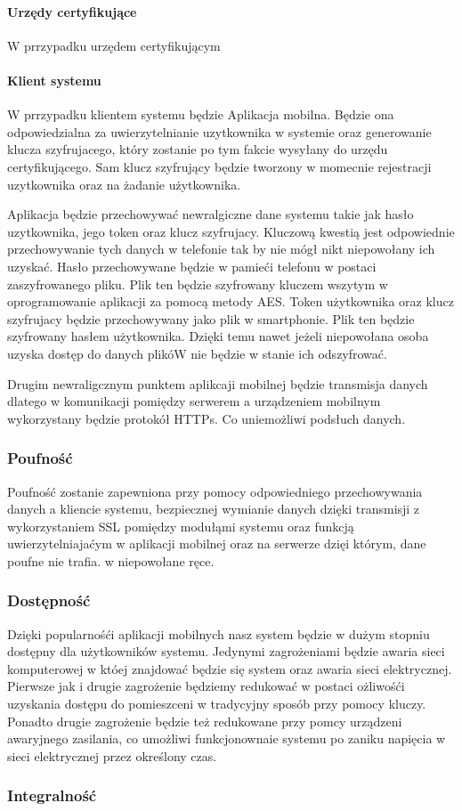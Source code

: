 		\paragraph*{Urzędy certyfikujące}
		W prrzypadku \NazwaSys urzędem certyfikującym 
		\paragraph*{Klient systemu}
		W prrzypadku \NazwaSys klientem systemu będzie Aplikacja mobilna. Będzie ona odpowiedzialna za uwierzytelnianie uzytkownika w systemie oraz generowanie klucza szyfrujacego, który zostanie po tym fakcie wysyłany do urzędu certyfikującego. Sam klucz szyfrujący będzie tworzony w momecnie rejestracji uzytkownika oraz na żadanie użytkownika.
		 
		Aplikacja będzie przechowywać newralgiczne dane systemu takie jak hasło uzytkownika, jego token oraz klucz szyfrujacy. Kluczową kwestią jest odpowiednie przechowywanie tych danych w telefonie tak by nie mógł nikt niepowołany ich uzyskać. Hasło przechowywane będzie w pamieći telefonu w postaci zaszyfrowanego pliku. Plik ten będzie szyfrowany kluczem wszytym w oprogramowanie aplikacji za pomocą metody AES. Token użytkownika oraz klucz szyfrujacy będzie przechowywany jako plik w smartphonie. Plik ten będzie szyfrowany hasłem użytkownika. Dzięki temu nawet jeżeli niepowołana osoba uzyska dostęp do danych plikóW nie będzie w stanie ich odszyfrować.
		
		Drugim newraligcznym punktem aplikcaji mobilnej będzie transmisja danych dlatego w komunikacji pomiędzy serwerem a urządzeniem mobilnym wykorzystany będzie protokół HTTPs. Co uniemożliwi podsłuch danych.
	\subsubsection{Poufność}
	Poufność zostanie zapewniona przy pomocy odpowiedniego przechowywania danych a kliencie systemu, bezpiecznej wymianie danych dzięki transmisji z wykorzystaniem SSL pomiędzy modułąmi systemu oraz funkcją uwierzytelniajaćym w aplikacji mobilnej oraz na serwerze dzięi którym, dane poufne nie trafia. w niepowołane ręce. 
	\subsubsection{Dostępność}
	Dzięki popularnośći aplikacji mobilnych nasz system będzie w dużym stopniu dostępny dla użytkowników systemu. Jedynymi zagrożeniami będzie awaria sieci komputerowej w któej znajdować będzie się system oraz awaria sieci elektrycznej. Pierwsze jak i drugie zagrożenie będziemy redukować w postaci ożliwośći uzyskania dostępu do pomieszceni w tradycyjny sposób przy pomocy kluczy. Ponadto drugie zagrożenie będzie też redukowane przy pomcy urządzeni awaryjnego zasilania, co umożliwi funkcjonownaie systemu po zaniku napięcia w sieci elektrycznej przez określony czas. 
	\subsubsection{Integralność}